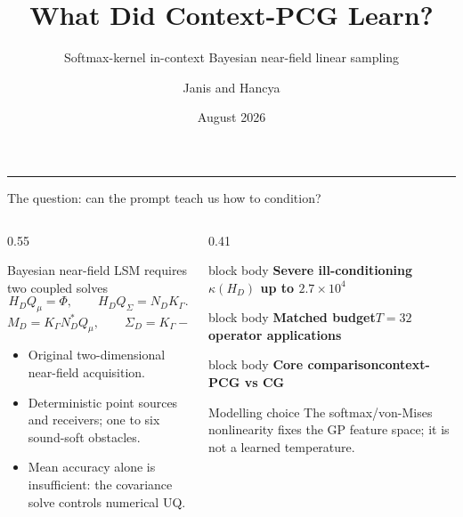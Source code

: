 \documentclass[aspectratio=169,10pt]{beamer}
\title{What Did Context-PCG Learn?}
\subtitle{Softmax-kernel in-context Bayesian near-field linear sampling}
\author{Janis and Hancya}
\date{August 2026}
\newcommand{\metric}[2]{%
  \begin{beamercolorbox}[rounded=true,sep=0.55em,wd=\linewidth]{block body}
    {\color{gold}\bfseries #1}\hfill {\bfseries #2}
  \end{beamercolorbox}}
\begin{document}
{
\begin{frame}[plain]
  \vfill
  \titlepage
  \vfill
  \begin{center}
    \color{gold}\rule{0.60\textwidth}{1.3pt}
  \end{center}
\end{frame}
}

\begin{frame}{The question: can the prompt teach us how to condition?}
\begin{columns}[T,onlytextwidth]
\begin{column}{0.55\textwidth}
  \begin{block}{Bayesian near-field LSM requires two coupled solves}
  \begin{equation*}
    H_DQ_\mu=\Phi,\qquad H_DQ_\Sigma=N_DK_\Gamma .
  \end{equation*}
  \begin{equation*}
    M_D=K_\Gamma N_D^*Q_\mu,\qquad
    \Sigma_D=K_\Gamma-K_\Gamma N_D^*Q_\Sigma .
  \end{equation*}
  \end{block}
  \begin{itemize}
    \item Original two-dimensional near-field acquisition.
    \item Deterministic point sources and receivers; one to six sound-soft obstacles.
    \item Mean accuracy alone is insufficient: the covariance solve controls numerical UQ.
  \end{itemize}
\end{column}
\begin{column}{0.41\textwidth}
  \metric{Severe ill-conditioning}{$\kappa(H_D)$ up to $2.7\times10^4$}
  \vspace{0.55em}
  \metric{Matched budget}{$T=32$ operator applications}
  \vspace{0.55em}
  \metric{Core comparison}{context-PCG vs CG}
  \vspace{0.8em}
  \begin{alertblock}{Modelling choice}
  The softmax/von-Mises nonlinearity fixes the GP feature space; it is not a learned temperature.
  \end{alertblock}
\end{column}
\end{columns}
\end{frame}
\end{document}
